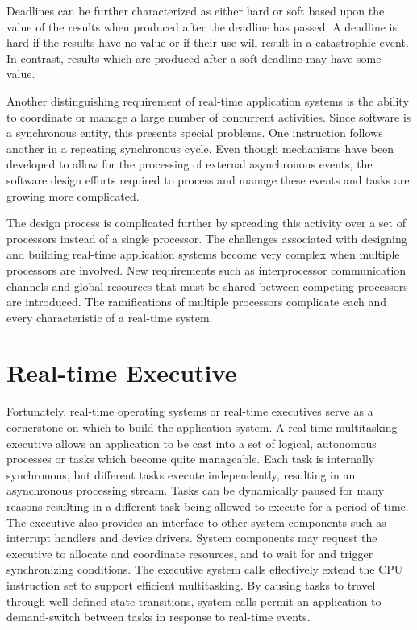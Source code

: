 Deadlines can be further characterized as either hard or soft based upon the value of the results when produced after the deadline has passed. A deadline is hard if the results have no value or if their use will result in a catastrophic event. In contrast, results which are produced after a soft deadline may have some value.

Another distinguishing requirement of real-\/time application systems is the ability to coordinate or manage a large number of concurrent activities. Since software is a synchronous entity, this presents special problems. One instruction follows another in a repeating synchronous cycle. Even though mechanisms have been developed to allow for the processing of external asynchronous events, the software design efforts required to process and manage these events and tasks are growing more complicated.

The design process is complicated further by spreading this activity over a set of processors instead of a single processor. The challenges associated with designing and building real-\/time application systems become very complex when multiple processors are involved. New requirements such as interprocessor communication channels and global resources that must be shared between competing processors are introduced. The ramifications of multiple processors complicate each and every characteristic of a real-\/time system.\hypertarget{RTEMSOverview_RTEMSOverviewSecRealtimeExecutive}{}\section{Real-\/time Executive}\label{RTEMSOverview_RTEMSOverviewSecRealtimeExecutive}
Fortunately, real-\/time operating systems or real-\/time executives serve as a cornerstone on which to build the application system. A real-\/time multitasking executive allows an application to be cast into a set of logical, autonomous processes or tasks which become quite manageable. Each task is internally synchronous, but different tasks execute independently, resulting in an asynchronous processing stream. Tasks can be dynamically paused for many reasons resulting in a different task being allowed to execute for a period of time. The executive also provides an interface to other system components such as interrupt handlers and device drivers. System components may request the executive to allocate and coordinate resources, and to wait for and trigger synchronizing conditions. The executive system calls effectively extend the C\+PU instruction set to support efficient multitasking. By causing tasks to travel through well-\/defined state transitions, system calls permit an application to demand-\/switch between tasks in response to real-\/time events.

